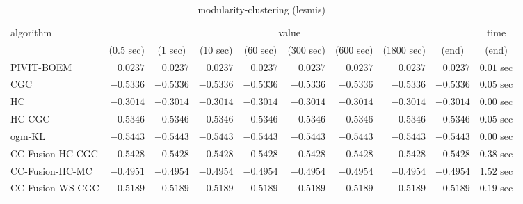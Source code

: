 \begin{table}[H]
\scriptsize
\centering
\caption{modularity-clustering (lesmis)}
\label{tab:anytimetable-modularity-clustering-lesmis}
\begin{tabular}{lrrrrrrrrr}
\toprule
           algorithm &                                   \multicolumn{8}{c}{value} & \multicolumn{1}{c}{time}   \\  
\cmidrule(lr){2-9}\cmidrule(lr){10-10}   
                     & \multicolumn{1}{c}{(0.5 sec)} & \multicolumn{1}{c}{(1 sec)} & \multicolumn{1}{c}{(10 sec)} & \multicolumn{1}{c}{(60 sec)} & \multicolumn{1}{c}{(300 sec)} & \multicolumn{1}{c}{(600 sec)} & \multicolumn{1}{c}{(1800 sec)} & \multicolumn{1}{c}{(end)} & \multicolumn{1}{c}{(end)}   \\ \midrule 
          PIVIT-BOEM & $       0.0237$ & $       0.0237$ & $       0.0237$ & $       0.0237$ & $       0.0237$ & $       0.0237$ & $       0.0237$ & $       0.0237$ & $         0.01$ sec   \\ 
                 CGC & $      -0.5336$ & $      -0.5336$ & $      -0.5336$ & $      -0.5336$ & $      -0.5336$ & $      -0.5336$ & $      -0.5336$ & $      -0.5336$ & $         0.05$ sec   \\ 
                  HC & $      -0.3014$ & $      -0.3014$ & $      -0.3014$ & $      -0.3014$ & $      -0.3014$ & $      -0.3014$ & $      -0.3014$ & $      -0.3014$ & $         0.00$ sec   \\ 
              HC-CGC & $      -0.5346$ & $      -0.5346$ & $      -0.5346$ & $      -0.5346$ & $      -0.5346$ & $      -0.5346$ & $      -0.5346$ & $      -0.5346$ & $         0.05$ sec   \\ 
              ogm-KL & $      -0.5443$ & $      -0.5443$ & $      -0.5443$ & $      -0.5443$ & $      -0.5443$ & $      -0.5443$ & $      -0.5443$ & $      -0.5443$ & $         0.00$ sec   \\ 
    CC-Fusion-HC-CGC & $      -0.5428$ & $      -0.5428$ & $      -0.5428$ & $      -0.5428$ & $      -0.5428$ & $      -0.5428$ & $      -0.5428$ & $      -0.5428$ & $         0.38$ sec   \\ 
     CC-Fusion-HC-MC & $      -0.4951$ & $      -0.4954$ & $      -0.4954$ & $      -0.4954$ & $      -0.4954$ & $      -0.4954$ & $      -0.4954$ & $      -0.4954$ & $         1.52$ sec   \\ 
    CC-Fusion-WS-CGC & $      -0.5189$ & $      -0.5189$ & $      -0.5189$ & $      -0.5189$ & $      -0.5189$ & $      -0.5189$ & $      -0.5189$ & $      -0.5189$ & $         0.19$ sec   \\ 

\end{tabular}
\end{table}
